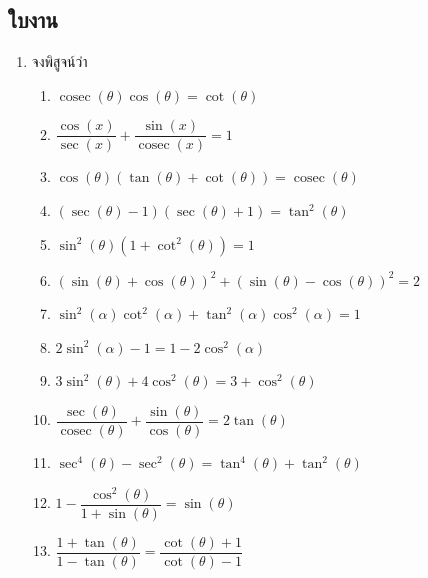 \subsection*{ใบงาน}
\begin{enumerate}[label=\arabic*., leftmargin=*, itemsep=1em]
	\item จงพิสูจน์ว่า
	\begin{enumerate}[label=\theenumi\arabic*), leftmargin=1.5em, itemsep=0.6em]
		\everymath{\displaystyle}
		\item $\operatorname{cosec} \left( \theta \right) \cos \left( \theta \right) = \cot \left( \theta \right)$
		\item $\dfrac{\cos \left( x \right)}{\sec \left( x \right)} + \dfrac{\sin \left( x \right)}{\operatorname{cosec} \left( x \right)} = 1$
		\item $\cos \left( \theta \right) \left( \tan \left( \theta \right) + \cot \left( \theta \right) \right) = \operatorname{cosec} \left( \theta \right)$
		\item $\left( \sec \left( \theta \right) - 1 \right) \left( \sec \left( \theta \right) + 1 \right) = \tan^{2} \left( \theta \right)$
		\item $\sin^{2} \left( \theta \right) \left( 1 + \cot^{2} \left( \theta \right) \right) = 1$
		\item $\left( \sin \left( \theta \right) + \cos \left( \theta \right) \right)^{2} + \left( \sin \left( \theta \right) - \cos \left( \theta \right) \right)^{2} = 2$
		\item $\sin^{2} \left( \alpha \right) \cot^{2} \left( \alpha \right) + \tan^{2} \left( \alpha \right) \cos^{2} \left( \alpha \right) = 1$
		\item $2 \sin^{2} \left( \alpha \right) - 1 = 1 - 2 \cos^{2} \left( \alpha \right)$
		\item $3 \sin^{2} \left( \theta \right) + 4 \cos^{2} \left( \theta \right) = 3 + \cos^{2} \left( \theta \right)$
		\item $\dfrac{\sec \left( \theta \right)}{\operatorname{cosec} \left( \theta \right)} + \dfrac{\sin \left( \theta \right)}{\cos \left( \theta \right)} = 2 \tan \left( \theta \right)$
		\item $\sec^{4} \left( \theta \right) - \sec^{2} \left( \theta \right) = \tan^{4} \left( \theta \right) + \tan^{2} \left( \theta \right)$
		\item $1 - \dfrac{\cos^{2} \left( \theta \right)}{1 + \sin \left( \theta \right)} = \sin \left( \theta \right)$
		\item $\dfrac{1 + \tan \left( \theta \right)}{1 - \tan \left( \theta \right)} = \dfrac{\cot \left( \theta \right) + 1}{\cot \left( \theta \right) - 1}$

\end{enumerate}
\end{enumerate}
